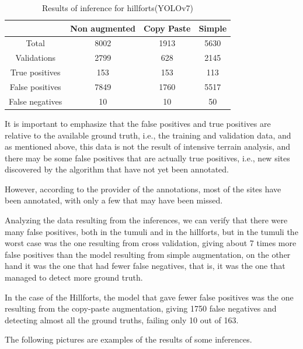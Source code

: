\begin{table}[H]
\centering
\begin{tabular}{|c c c c|} 
 \hline
  & Non augmented  & Copy Paste & Simple \\ [0.5ex] 
 \hline\hline
 Total & 8002 & 1913 & 5630 \\ 
 Validations & 2799 & 628 & 2145\\
 True positives & 153 & 153 & 113 \\
 False positives & 7849 & 1760 & 5517 \\
 False negatives & 10 & 10 & 50\\ [1ex] 
 \hline
\end{tabular}
\caption{Results of inference for hillforts(YOLOv7)}
\end{table}
It is important to emphasize that the false positives and true positives are relative to the available ground truth, i.e., the training and validation data, and as mentioned above, this data is not the result of intensive terrain analysis, and there may be some false positives that are actually true positives, i.e., new sites discovered by the algorithm that have not yet been annotated.

However, according to the provider of the annotations, most of the sites have been annotated, with only a few that may have been missed.

Analyzing the data resulting from the inferences, we can verify that there were many false positives, both in the tumuli and in the hillforts, but in the tumuli the worst case was the one resulting from cross validation, giving about 7 times more false positives than the model resulting from simple augmentation, on the other hand it was the one that had fewer false negatives, that is, it was the one that managed to detect more ground truth.

In the case of the Hillforts, the model that gave fewer false positives was the one resulting from the copy-paste augmentation, giving 1750 false negatives and detecting almost all the ground truths, failing only 10 out of 163.


The following pictures are examples of the results of some inferences.

